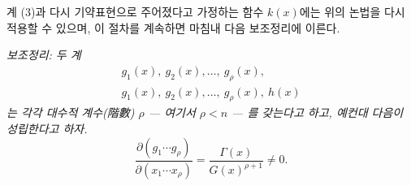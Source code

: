 
계 (3)과 다시 기약표현으로 주어졌다고 가정하는 함수 $k(x)$에는 위의 논법을 다시 적용할 수 있으며, 이 절차를 계속하면 마침내 다음 보조정리에 이른다.

\emph{보조정리: 두 계}
\[
\begin{array}{c}
g_1(x),\ g_2(x),\ldots,\ g_\rho(x),\\
g_1(x),\ g_2(x),\ldots,\ g_\rho(x),\ h(x)
\end{array}
\]
\emph{는 각각 대수적 계수(階數) $\rho$ --- 여기서 $\rho<n$ --- 를 갖는다고 하고, 예컨대 다음이 성립한다고 하자.}
\[
 \frac{\partial(g_1\cdots g_\rho)}
 {\partial(x_1\cdots x_\rho)}
 =\frac{\Gamma(x)}{G(x)^{\rho+1}}\ne0.
\]
